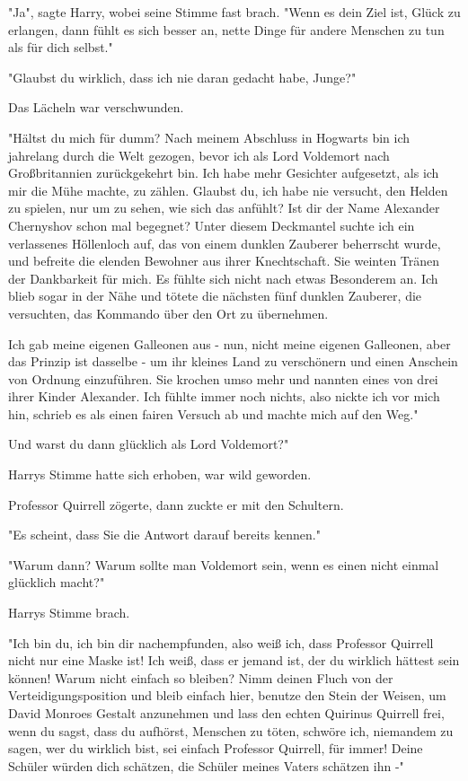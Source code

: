 {"Ja", sagte Harry, wobei seine Stimme fast brach. "Wenn es dein Ziel ist, Glück zu erlangen, dann fühlt es sich besser an, nette Dinge für andere Menschen zu tun als für dich selbst."

"Glaubst du wirklich, dass ich nie daran gedacht habe, Junge?"

Das Lächeln war verschwunden.

"Hältst du mich für dumm? Nach meinem Abschluss in Hogwarts bin ich jahrelang durch die Welt gezogen, bevor ich als Lord Voldemort nach Großbritannien zurückgekehrt bin. Ich habe mehr Gesichter aufgesetzt, als ich mir die Mühe machte, zu zählen. Glaubst du, ich habe nie versucht, den Helden zu spielen, nur um zu sehen, wie sich das anfühlt? Ist dir der Name Alexander Chernyshov schon mal begegnet? Unter diesem Deckmantel suchte ich ein verlassenes Höllenloch auf, das von einem dunklen Zauberer beherrscht wurde, und befreite die elenden Bewohner aus ihrer Knechtschaft. Sie weinten Tränen der Dankbarkeit für mich. Es fühlte sich nicht nach etwas Besonderem an. Ich blieb sogar in der Nähe und tötete die nächsten fünf dunklen Zauberer, die versuchten, das Kommando über den Ort zu übernehmen.

Ich gab meine eigenen Galleonen aus - nun, nicht meine eigenen Galleonen, aber das Prinzip ist dasselbe - um ihr kleines Land zu verschönern und einen Anschein von Ordnung einzuführen. Sie krochen umso mehr und nannten eines von drei ihrer Kinder Alexander. Ich fühlte immer noch nichts, also nickte ich vor mich hin, schrieb es als einen fairen Versuch ab und machte mich auf den Weg."

Und warst du dann glücklich als Lord Voldemort?"

Harrys Stimme hatte sich erhoben, war wild geworden.

Professor Quirrell zögerte, dann zuckte er mit den Schultern.

"Es scheint, dass Sie die Antwort darauf bereits kennen."

"Warum dann? Warum sollte man Voldemort sein, wenn es einen nicht einmal glücklich macht?"

Harrys Stimme brach.

"Ich bin du, ich bin dir nachempfunden, also weiß ich, dass Professor Quirrell nicht nur eine Maske ist! Ich weiß, dass er jemand ist, der du wirklich hättest sein können! Warum nicht einfach so bleiben? Nimm deinen Fluch von der Verteidigungsposition und bleib einfach hier, benutze den Stein der Weisen, um David Monroes Gestalt anzunehmen und lass den echten Quirinus Quirrell frei, wenn du sagst, dass du aufhörst, Menschen zu töten, schwöre ich, niemandem zu sagen, wer du wirklich bist, sei einfach Professor Quirrell, für immer! Deine Schüler würden dich schätzen, die Schüler meines Vaters schätzen ihn -"

}
